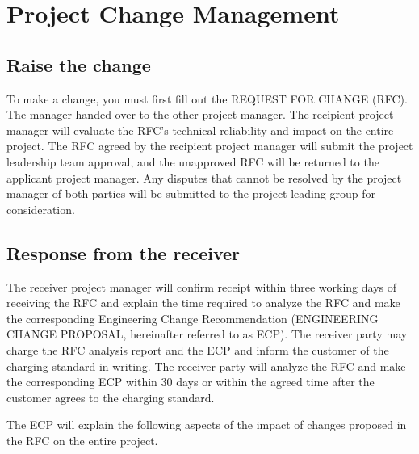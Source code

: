 \chapter{Project Change Management}

\section{Raise the change}

To make a change, you must first fill out the REQUEST FOR CHANGE (RFC). The manager handed over to the other project manager. The recipient project manager will evaluate the RFC's technical reliability and impact on the entire project. The RFC agreed by the recipient project manager will submit the project leadership team approval, and the unapproved RFC will be returned to the applicant project manager. Any disputes that cannot be resolved by the project manager of both parties will be submitted to the project leading group for consideration.

\section{Response from the receiver}

The receiver project manager will confirm receipt within three working days of receiving the RFC and explain the time required to analyze the RFC and make the corresponding Engineering Change Recommendation (ENGINEERING CHANGE PROPOSAL, hereinafter referred to as ECP). The receiver party may charge the RFC analysis report and the ECP and inform the customer of the charging standard in writing. The receiver party will analyze the RFC and make the corresponding ECP within 30 days or within the agreed time after the customer agrees to the charging standard. 

The ECP will explain the following aspects of the impact of changes proposed in the RFC on the entire project.

